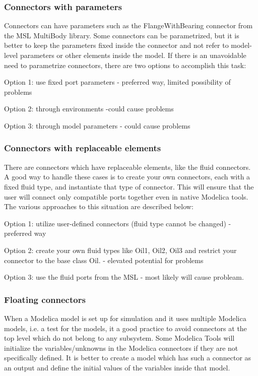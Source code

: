 \subsubsection{Connectors with parameters}
Connectors can have parameters such as the FlangeWithBearing connector from the MSL MultiBody library. Some connectors can be parametrized, but it is better to keep the parameters fixed inside the connector and not refer to model-level parameters or other elements inside the model. If there is an unavoidable need to parametrize connectors, there are two options to accomplish this task:

Option 1: use fixed port parameters - preferred way, limited possibility of problems

Option 2: through environments -could cause problems %

Option 3: through model parameters - could cause problems %

\subsubsection{Connectors with replaceable elements}
There are connectors which have replaceable elements, like the fluid connectors. A good way to handle these cases is to create your own connectors, each with a fixed fluid type, and instantiate that type of connector. This will ensure that the user will connect only compatible ports together even in native Modelica tools. The various approaches to this situation are described below:

Option 1: utilize user-defined connectors (fluid type cannot be changed) - preferred way

Option 2: create your own fluid types like Oil1, Oil2, Oil3 and restrict your connector to the base class Oil. - elevated potential for problems %

Option 3: use the fluid ports from the MSL - most likely will cause probleam. %

\subsubsection{Floating connectors}
When a Modelica model is set up for simulation and it uses multiple Modelica models, i.e. a test for the models, it a good practice to avoid connectors at the top level which do not belong to any subsystem. Some Modelica Tools will initialize the variables/unknowns in the Modelica connectors if they are not specifically defined. It is better to create a model which has such a connector as an output and define the initial values of the variables inside that model.


